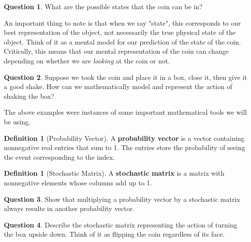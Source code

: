 \documentclass[letterpaper, 12pt]{article}
\newcommand{\1}{\mathds{1}}	%
\theoremstyle{definition}
\newtheorem{definition}[theorem]{Definition}
\newtheorem{question}{Question}
\begin{document}
\begin{question}
    What are the possible states that the coin can be in?
\end{question}
\vspace{20mm} %

An important thing to note is that when we say "state", this corresponds to our best representation of the object, not necessarily the true physical state of the object. Think of it as a mental model for our prediction of the state of the coin. Critically, this means that our mental representation of the coin can change depending on whether we are \textit{looking} at the coin or not. %

\begin{question}
    Suppose we took the coin and place it in a box, close it, then give it a good shake. How can we mathematically model and represent the action of shaking the box? 
\end{question}
\vspace{35mm} %

The above examples were instances of some important mathematical tools we will be using. 

\begin{definition}[Probability Vector]
    A \textbf{probability vector} is a vector containing nonnegative real entries that sum to 1. The entries store the probability of seeing the event corresponding to the index. 
\end{definition}

\begin{definition}[Stochastic Matrix]
    A \textbf{stochastic matrix} is a matrix with nonnegative elements whose columns add up to 1. 
\end{definition}

\begin{question}
    Show that multiplying a probability vector by a stochastic matrix always results in another probability vector. 
\end{question}
\vspace{40mm}

\begin{question}
    Describe the stochastic matrix representing the action of turning the box upside down. Think of it as flipping the coin regardless of its face. 
\end{question}
\vspace{40mm} %
\end{document}

